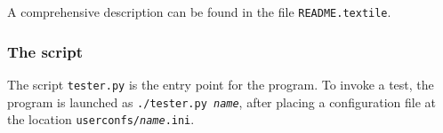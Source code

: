 A comprehensive description can be found in the file {\tt README.textile}.


\subsubsection{The script}

The script \verb|tester.py| is the entry point for the program.
To invoke a test, the program is launched as {\tt ./tester.py \it name}, after placing a configuration file at the location {\tt userconfs/{\it name}.ini}.
